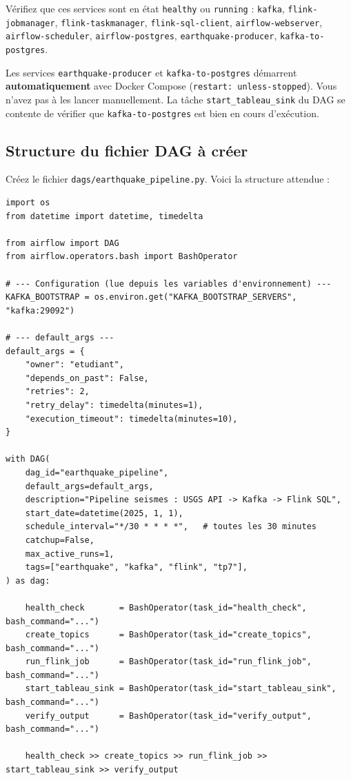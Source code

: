 \documentclass[12pt,a4paper]{article}
\begin{document}
Vérifiez que ces services sont en état \texttt{healthy} ou \texttt{running} :
\texttt{kafka}, \texttt{flink-jobmanager}, \texttt{flink-taskmanager},
\texttt{flink-sql-client}, \texttt{airflow-webserver}, \texttt{airflow-scheduler},
\texttt{airflow-postgres}, \texttt{earthquake-producer}, \texttt{kafka-to-postgres}.

\begin{warningbox}
  Les services \texttt{earthquake-producer} et \texttt{kafka-to-postgres} démarrent
  \textbf{automatiquement} avec Docker Compose (\texttt{restart: unless-stopped}).
  Vous n'avez pas à les lancer manuellement.
  La tâche \texttt{start\_tableau\_sink} du DAG se contente de vérifier
  que \texttt{kafka-to-postgres} est bien en cours d'exécution.
\end{warningbox}

\subsection{Structure du fichier DAG à créer}

Créez le fichier \texttt{dags/earthquake\_pipeline.py}. Voici la structure attendue :

\begin{lstlisting}[style=python, caption={Squelette du DAG --- dags/earthquake\_pipeline.py}]
import os
from datetime import datetime, timedelta

from airflow import DAG
from airflow.operators.bash import BashOperator

# --- Configuration (lue depuis les variables d'environnement) ---
KAFKA_BOOTSTRAP = os.environ.get("KAFKA_BOOTSTRAP_SERVERS", "kafka:29092")

# --- default_args ---
default_args = {
    "owner": "etudiant",
    "depends_on_past": False,
    "retries": 2,
    "retry_delay": timedelta(minutes=1),
    "execution_timeout": timedelta(minutes=10),
}

with DAG(
    dag_id="earthquake_pipeline",
    default_args=default_args,
    description="Pipeline seismes : USGS API -> Kafka -> Flink SQL",
    start_date=datetime(2025, 1, 1),
    schedule_interval="*/30 * * * *",   # toutes les 30 minutes
    catchup=False,
    max_active_runs=1,
    tags=["earthquake", "kafka", "flink", "tp7"],
) as dag:

    health_check       = BashOperator(task_id="health_check",       bash_command="...")
    create_topics      = BashOperator(task_id="create_topics",      bash_command="...")
    run_flink_job      = BashOperator(task_id="run_flink_job",      bash_command="...")
    start_tableau_sink = BashOperator(task_id="start_tableau_sink", bash_command="...")
    verify_output      = BashOperator(task_id="verify_output",      bash_command="...")

    health_check >> create_topics >> run_flink_job >> start_tableau_sink >> verify_output
\end{lstlisting}
\end{document}
